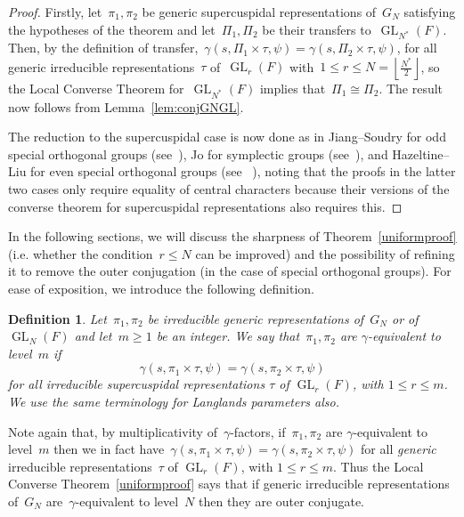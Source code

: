 \documentclass[12pt]{amsart}
\newcommand{\GL}{\operatorname{GL}}
\newtheorem{defn}[thm]{Definition}
\newtheorem{defn}[equation]{Definition}
\begin{document}
\begin{proof}
Firstly, let~$\pi_1,\pi_2$ be generic supercuspidal representations of~$G_N$ satisfying the hypotheses of the theorem and let~$\Pi_1,\Pi_2$ be their transfers to~$\GL_{N^*}(F)$. Then, by the definition of transfer,~$\gamma(s, \Pi_1 \times \tau, \psi) = \gamma(s, \Pi_2 \times \tau, \psi)$, for all generic irreducible representations~$\tau$ of~$\GL_r(F)$ with~$1\le r\le N=\left\lfloor \frac{N^*}2\right\rfloor$, so the Local Converse Theorem for~$\GL_{N^*}(F)$ implies that~$\Pi_1\cong\Pi_2$. The result now follows from Lemma~\ref{lem:conjGNGL}.

The reduction to the supercuspidal case is now done as in Jiang--Soudry for odd special orthogonal groups (see~\cite[Theorem~5.1]{JS03}), Jo for symplectic groups (see~\cite[Proposition~2.10]{Jo22}),  and Hazeltine--Liu for even special orthogonal groups (see~\cite[Theorem~4.3]{HZ23} ), noting that the proofs in the latter two cases only require equality of central characters because their versions of the converse theorem for supercuspidal representations also requires this.
\end{proof}


In the following sections, we will discuss the sharpness of Theorem~\ref{uniformproof} (i.e. whether the condition~$r\le N$ can be improved) and the possibility of refining it to remove the outer conjugation (in the case of special orthogonal groups). For ease of exposition, we introduce the following definition.

\begin{defn}
Let~$\pi_1,\pi_2$ be irreducible generic representations of~$G_N$ or of~$\GL_N(F)$ and let~$m\ge 1$ be an integer. We say that~$\pi_1,\pi_2$ are \emph{$\gamma$-equivalent to level~$m$} if
\[
\gamma(s, \pi_1 \times \tau, \psi) = \gamma(s, \pi_2 \times \tau, \psi)
\]
for all irreducible supercuspidal representations $\tau$ of $\GL_r(F)$, with $1\le r\le m$. We use the same terminology for Langlands parameters also.
\end{defn}

Note again that, by multiplicativity of~$\gamma$-factors, if~$\pi_1,\pi_2$ are $\gamma$-equivalent to level~$m$ then we in fact have~$\gamma(s, \pi_1 \times \tau, \psi) = \gamma(s, \pi_2 \times \tau, \psi)$ for all \emph{generic} irreducible representations~$\tau$ of $\GL_r(F)$, with $1\le r\le m$. Thus the Local Converse Theorem~\ref{uniformproof} says that if generic irreducible representations of~$G_N$ are~$\gamma$-equivalent to level~$N$ then they are outer conjugate. 
\end{document}
